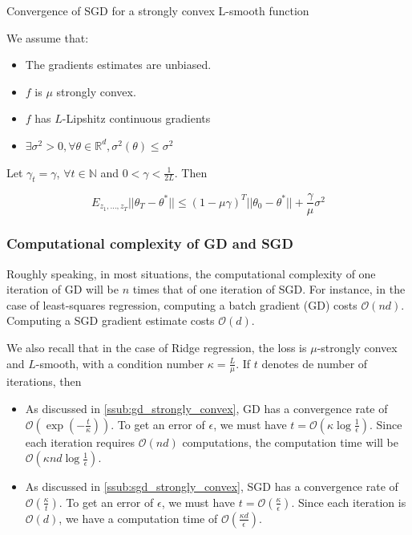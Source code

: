 \documentclass[
10pt, %
a4paper, %
oneside, %
headinclude,footinclude, %
BCOR5mm, %
]{scrartcl}
\begin{document}
\begin{theorem}{Convergence of SGD for a strongly convex L-smooth function}
    
    We assume that:
    \begin{itemize}
	\item The gradients estimates are unbiased.
        \item $f$ is $\mu$ strongly convex.
	\item $f$ has $L$-Lipshitz continuous gradients
	\item $\exists \sigma^2>0, \forall \theta \in \mathbb{R}^d, \sigma^2(\theta)\leq \sigma^2$
    \end{itemize}
    Let $\gamma_t = \gamma$, $\forall t\in \mathbb{N} $ and $ 0<\gamma < \frac{1}{2L} $. Then

    \begin{equation}
	E_{z_1, \dots, z_T}||\theta_T-\theta^*||\leq (1-\mu\gamma)^T||\theta_0-\theta^*|| + \frac{ \gamma}{\mu} \sigma^2
    \end{equation}
\end{theorem}


\subsubsection{\large\color{Periwinkle}Computational complexity of GD and SGD}

Roughly speaking, in most situations, the computational complexity of one
iteration of GD will be $n$ times that of one iteration of SGD. For instance, in the case of least-squares regression, computing a batch gradient (GD) costs $ \mathcal{O} (nd)$. Computing a SGD gradient estimate costs $ \mathcal{O} (d)$.

We also recall that in the case of Ridge regression, the loss is $\mu$-strongly convex and $L$-smooth, with a condition number $\kappa = \frac{L}{\mu} $. If $t$ denotes de number of iterations, then
\begin{itemize}
    \item As discussed in \ref{ssub:gd_strongly_convex}, GD has a convergence rate of $\mathcal{O} (\exp( - \frac{t}{\kappa} ))$. To get an error of $\epsilon$, we must have $ t= \mathcal{O} ( \kappa \log \frac{1}{\epsilon} )$. Since each iteration requires $ \mathcal{O} (nd)$ computations, the computation time will be $ \mathcal{O} (\kappa nd\log\frac{1}{\epsilon}) $.
    \item As discussed in \ref{ssub:sgd_strongly_convex}, SGD has a convergence rate of $ \mathcal{O} ( \frac{\kappa}{t} )$. To get an error of $\epsilon$, we must have $ t = \mathcal{O}( \frac{\kappa}{\epsilon} ) $. Since each iteration is $ \mathcal{O} (d)$, we have a computation time of $ \mathcal{O} ( \frac{\kappa d}{\epsilon} )$.

\end{itemize}
\end{document}
